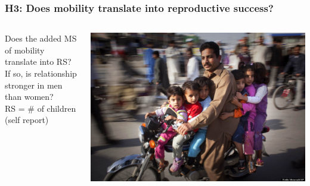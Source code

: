 \documentclass{beamer}
\begin{document}
\begin{frame}
\frametitle{H3: Does mobility translate into reproductive success?}

\begin{columns}
\begin{column}{.5\textwidth}
Does the added MS of mobility translate into RS? \\
\vspace{0.75cm} 
If so, is relationship stronger in men than women? \\
\vspace{0.75cm} 
RS = \# of children (self report)

\end{column}

\begin{column}{.5\textwidth}
\includegraphics[width= 1\textwidth]{travelrs}
\end{column}

\end{columns}

\end{frame}

\end{document}
